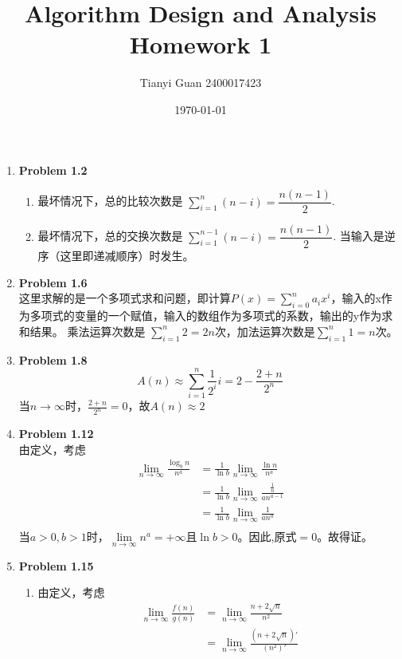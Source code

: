 \documentclass[utf8]{ctexart}
\title{\vspace*{-1cm}Algorithm Design and Analysis Homework 1}
\author{Tianyi Guan 2400017423}
\date{\today}
\begin{document}
\maketitle

\begin{enumerate}[label=\arabic*.]
    \item \textbf{Problem 1.2} 
    \begin{enumerate}[label= (\arabic*)]
        \item 最坏情况下，总的比较次数是 $\displaystyle \sum_{i=1}^{n}(n-i)=\dfrac{n(n-1)}{2}$.
        \item 最坏情况下，总的交换次数是 $\displaystyle \sum_{i=1}^{n-1}(n-i)=\dfrac{n(n-1)}{2}$. 
        当输入是逆序（这里即递减顺序）时发生。
    \end{enumerate}
    \item \textbf{Problem 1.6}\\
        这里求解的是一个多项式求和问题，即计算$P(x)=\sum_{i=0}^{n}a_ix^i$，输入的x作为多项式的变量的一个赋值，输入的数组作为多项式的系数，输出的y作为求和结果。
        乘法运算次数是 $\sum_{i=1}^{n}2=2n$次，加法运算次数是$\sum_{i=1}^{n}1=n$次。
    \item \textbf{Problem 1.8}
        \[ A(n)\approx \sum_{i=1}^{n}\frac{1}{2^i}i = 2-\frac{2+n}{2^n}\]当$n\to\infty$时，$\frac{2+n}{2^n}=0$，故$A(n)\approx2$
    \item \textbf{Problem 1.12}\\
        由定义，考虑\[\begin{aligned}
            \lim_{n \to \infty} \frac{\log_{b} n}{n^a}&=\frac{1}{\ln b}\lim_{n\to\infty}\frac{\ln n}{n^a}\\
            &=\frac{1}{\ln b}\lim_{n\to\infty}\frac{\frac{1}{n}}{an^{a-1}}\\
            &=\frac{1}{\ln b}\lim_{n\to\infty}\frac{1}{an^{a}}\\         
        \end{aligned}\]
        当$a>0,b>1$时，$\lim\limits_{n\to\infty}n^{a}=+\infty\text{且}\ln b>0$。因此,原式$=0$。故得证。
    \item \textbf{Problem 1.15}
    \begin{enumerate}[label= (\arabic*)]
        \item[(2)] 由定义，考虑 \[ \begin{aligned}
        \lim_{n\to\infty}\frac{f(n)}{g(n)}&=\lim_{n\to\infty}\frac{n+2\sqrt{n}}{n^2}\\
        &=\lim_{n\to\infty}\frac{(n+2\sqrt{n})'}{(n^2)'}\\

\end{aligned}\]
\end{enumerate}
\end{enumerate}
\end{document}
